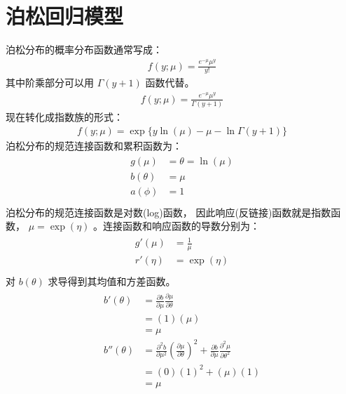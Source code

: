 \documentclass[letterpaper,10pt,english]{sphinxmanual}
\begin{document}
\section{泊松回归模型}
\label{\detokenize{_u6cca_u677e_u6a21_u578b/content:id5}}
泊松分布的概率分布函数通常写成：
\begin{equation}\label{equation:泊松模型/content:泊松模型/content:2}
\begin{split}f(y;\mu) = \frac{e^{-\mu} \mu^{y}}{y!}\end{split}
\end{equation}
其中阶乘部分可以用 \(\Gamma(y+1)\) 函数代替。
\begin{equation}\label{equation:泊松模型/content:泊松模型/content:3}
\begin{split}f(y;\mu) = \frac{e^{-\mu} \mu^{y}}{\Gamma(y+1)}\end{split}
\end{equation}
现在转化成指数族的形式：
\begin{equation}\label{equation:泊松模型/content:泊松模型/content:4}
\begin{split}f(y;\mu)=\exp \{ y\ln(\mu) -\mu- \ln \Gamma(y+1)   \}\end{split}
\end{equation}
泊松分布的规范连接函数和累积函数为：
\begin{align}\label{equation:泊松模型/content:泊松模型/content:5}\!\begin{aligned}
g(\mu) &= \theta=\ln(\mu)\\
b(\theta) &= \mu\\
a(\phi) &= 1\\
\end{aligned}\end{align}
泊松分布的规范连接函数是对数(log)函数，
因此响应(反链接)函数就是指数函数， \(\mu=\exp(\eta)\)
。连接函数和响应函数的导数分别为：
\begin{align}\label{equation:泊松模型/content:泊松模型/content:6}\!\begin{aligned}
g'(\mu) &= \frac{1}{\mu}\\
r'(\eta) &= \exp(\eta)\\
\end{aligned}\end{align}
对 \(b(\theta)\) 求导得到其均值和方差函数。
\begin{align}\label{equation:泊松模型/content:泊松模型/content:7}\!\begin{aligned}
b'(\theta) &= \frac{\partial b}{\partial \mu} \frac{\partial \mu}{\partial \theta}\\
&= (1)(\mu)\\
&= \mu\\
b''(\theta) &= \frac{\partial^2 b}{\partial \mu^2}
\left( \frac{\partial \mu}{\partial \theta}   \right )^2
+\frac{\partial b}{\partial \mu}
\frac{\partial^2 \mu }{\partial \theta^2}\\
&= (0)(1)^2+(\mu)(1)\\
&= \mu\\
\end{aligned}\end{align}
\end{document}
